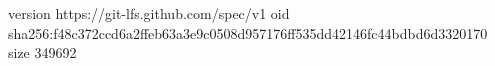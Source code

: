 version https://git-lfs.github.com/spec/v1
oid sha256:f48c372ccd6a2ffeb63a3e9c0508d957176ff535dd42146fc44bdbd6d3320170
size 349692
